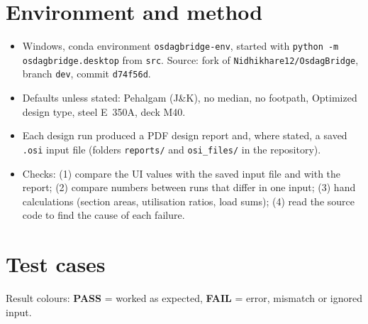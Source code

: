 \documentclass[10pt,a4paper]{article}
\begin{document}
\section{Environment and method}
\begin{itemize}[nosep]
\item Windows, conda environment \texttt{osdagbridge-env}, started with \texttt{python -m osdagbridge.desktop} from \texttt{src}. Source: fork of \texttt{Nidhikhare12/OsdagBridge}, branch \texttt{dev}, commit \texttt{d74f56d}.
\item Defaults unless stated: Pehalgam (J\&K), no median, no footpath, Optimized design type, steel E~350A, deck M40.
\item Each design run produced a PDF design report and, where stated, a saved \texttt{.osi} input file (folders \texttt{reports/} and \texttt{osi\_files/} in the repository).
\item Checks: (1) compare the UI values with the saved input file and with the report; (2) compare numbers between runs that differ in one input; (3) hand calculations (section areas, utilisation ratios, load sums); (4) read the source code to find the cause of each failure.
\end{itemize}

\section{Test cases}
Result colours: \textcolor{passc}{\textbf{PASS}} = worked as expected, \textcolor{failc}{\textbf{FAIL}} = error, mismatch or ignored input.
\end{document}
